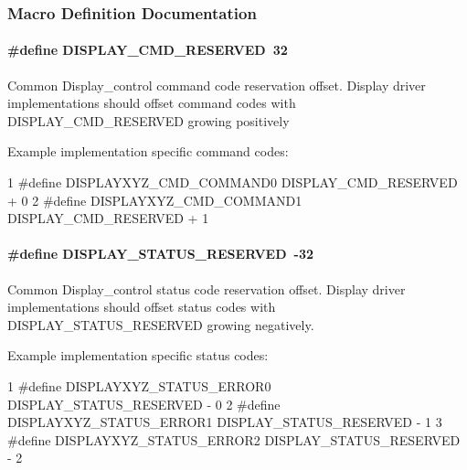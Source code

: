 \subsubsection{Macro Definition Documentation}
\paragraph[{D\+I\+S\+P\+L\+A\+Y\+\_\+\+C\+M\+D\+\_\+\+R\+E\+S\+E\+R\+V\+E\+D}]{\setlength{\rightskip}{0pt plus 5cm}\#define D\+I\+S\+P\+L\+A\+Y\+\_\+\+C\+M\+D\+\_\+\+R\+E\+S\+E\+R\+V\+E\+D~32}\label{group___d_i_s_p_l_a_y___c_o_n_t_r_o_l_ga99c2401cd11ea3b49e5e3e4ffac5c886}
Common Display\+\_\+control command code reservation offset. Display driver implementations should offset command codes with D\+I\+S\+P\+L\+A\+Y\+\_\+\+C\+M\+D\+\_\+\+R\+E\+S\+E\+R\+V\+E\+D growing positively

Example implementation specific command codes\+: 
\begin{DoxyCode}
1 #define DISPLAYXYZ\_CMD\_COMMAND0     DISPLAY\_CMD\_RESERVED + 0
2 #define DISPLAYXYZ\_CMD\_COMMAND1     DISPLAY\_CMD\_RESERVED + 1
\end{DoxyCode}
\paragraph[{D\+I\+S\+P\+L\+A\+Y\+\_\+\+S\+T\+A\+T\+U\+S\+\_\+\+R\+E\+S\+E\+R\+V\+E\+D}]{\setlength{\rightskip}{0pt plus 5cm}\#define D\+I\+S\+P\+L\+A\+Y\+\_\+\+S\+T\+A\+T\+U\+S\+\_\+\+R\+E\+S\+E\+R\+V\+E\+D~-\/32}\label{group___d_i_s_p_l_a_y___c_o_n_t_r_o_l_gacb7031dd18c19e3ecb86d97cb7b17abb}
Common Display\+\_\+control status code reservation offset. Display driver implementations should offset status codes with D\+I\+S\+P\+L\+A\+Y\+\_\+\+S\+T\+A\+T\+U\+S\+\_\+\+R\+E\+S\+E\+R\+V\+E\+D growing negatively.

Example implementation specific status codes\+: 
\begin{DoxyCode}
1 #define DISPLAYXYZ\_STATUS\_ERROR0    DISPLAY\_STATUS\_RESERVED - 0
2 #define DISPLAYXYZ\_STATUS\_ERROR1    DISPLAY\_STATUS\_RESERVED - 1
3 #define DISPLAYXYZ\_STATUS\_ERROR2    DISPLAY\_STATUS\_RESERVED - 2
\end{DoxyCode}
 